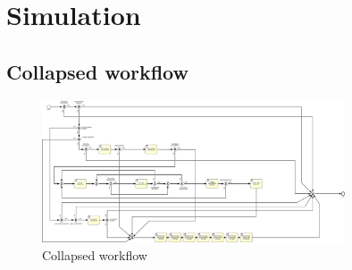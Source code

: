 \section{Simulation}

\subsection{Collapsed workflow}

\begin{figure}[H]
\centering
\includegraphics[width=0.8\textwidth]{figures/Collapsed Workflow SIM.pdf}
\caption{Collapsed workflow}
\label{fig:collapsed_workflow}
\end{figure}
